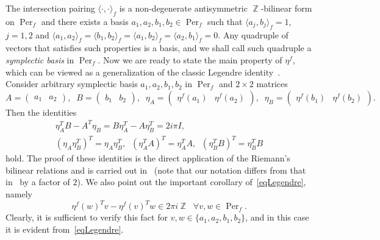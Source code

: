 \documentclass{amsart}
\numberwithin{equation}{section}
\theoremstyle{definition}
\theoremstyle{remark}
\DeclareMathOperator{\ZZ}{\mathbb Z}
\DeclareMathOperator{\Per}{Per}
\begin{document}
	The intersection pairing $\langle \cdot, \cdot \rangle_f$ is a non-degenerate antisymmetric $\ZZ$-bilinear form on $\Per_f$ and there exists a basis $a_1,a_2,b_1,b_2 \in \Per_f$ such that $\langle a_j, b_j\rangle_f = 1$, $j = 1,2$ and $\langle a_1, a_2 \rangle_f = \langle b_1, b_2 \rangle_f = \langle a_1, b_2 \rangle_f = \langle a_2 , b_1\rangle_f = 0$. Any quadruple of vectors that satisfies such properties is a basis, and we shall call such quadruple a {\it{symplectic basis}} in $\Per_f$. Now we are ready to state the main property of $\eta^f$, which can be viewed as a generalization of the classic Legendre identity~\cite[Theorem~4.2]{Chandra}. Consider arbitrary symplectic basis $a_1, a_2, b_1, b_2$ in $\Per_f$ and $2 \times 2$ matrices
	\begin{equation}\label{eqMatrices}
		A = \begin{pmatrix}
			a_1 & a_2
		\end{pmatrix},\;\;
		B = \begin{pmatrix}
			b_1 & b_2
		\end{pmatrix},\;\;
		\eta_A = \begin{pmatrix}
			\eta^f(a_1) & \eta^f(a_2)
		\end{pmatrix},\;\;
		\eta_B = \begin{pmatrix}
			\eta^f(b_1) & \eta^f(b_2)
		\end{pmatrix}.
	\end{equation}
	Then the identities
	\begin{equation}\label{eqLegendre}
		\begin{gathered}
			\eta_A^T B - A^T \eta_B = B \eta_A^T - A\eta_B^T= 2i\pi I, \\
			\left(\eta_A \eta_B^T\right)^T = \eta_A\eta_B^T,\;\; (\eta_A^TA)^T = \eta_A^TA,\;\;(\eta_B^TB)^T = \eta_B^TB
		\end{gathered}
	\end{equation}
	hold. The proof of these identities is the direct application of the Riemann's bilinear relations and is carried out in~\cite[\S~8]{baker} (note that our notation differs from that in~\cite{baker} by a factor of $2$). We also point out the important corollary of~\eqref{eqLegendre}, namely
	\begin{equation}\label{eqEtaIntValues}
		\eta^f(w)^Tv - \eta^f(v)^Tw \in 2\pi i \ZZ\;\;\forall v,w \in \Per_f.
	\end{equation}
	Clearly, it is sufficient to verify this fact for $v,w \in \{a_1,a_2,b_1,b_2\}$, and in this case it is evident from~\eqref{eqLegendre}.
	
\end{document}
